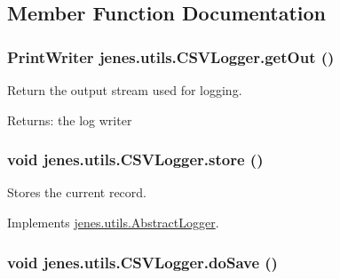 \subsection{Member Function Documentation}
\hypertarget{classjenes_1_1utils_1_1_c_s_v_logger_00671f9154ae65398d676e6526fa08f2}{
\subsubsection[getOut]{\setlength{\rightskip}{0pt plus 5cm}PrintWriter jenes.utils.CSVLogger.getOut ()}}
\label{classjenes_1_1utils_1_1_c_s_v_logger_00671f9154ae65398d676e6526fa08f2}


Return the output stream used for logging.

\begin{Desc}
\item[Returns:]the log writer \end{Desc}
\hypertarget{classjenes_1_1utils_1_1_c_s_v_logger_863bcfda3e93b023949a81e7f6d149e7}{
\subsubsection[store]{\setlength{\rightskip}{0pt plus 5cm}void jenes.utils.CSVLogger.store ()}}
\label{classjenes_1_1utils_1_1_c_s_v_logger_863bcfda3e93b023949a81e7f6d149e7}


Stores the current record. 

Implements \hyperlink{classjenes_1_1utils_1_1_abstract_logger_6acf83a83999e26ae4ed45cbf355111b}{jenes.utils.AbstractLogger}.\hypertarget{classjenes_1_1utils_1_1_c_s_v_logger_09a4f4fc362db6d4090d75642521ee65}{
\subsubsection[doSave]{\setlength{\rightskip}{0pt plus 5cm}void jenes.utils.CSVLogger.doSave ()}}
\label{classjenes_1_1utils_1_1_c_s_v_logger_09a4f4fc362db6d4090d75642521ee65}


